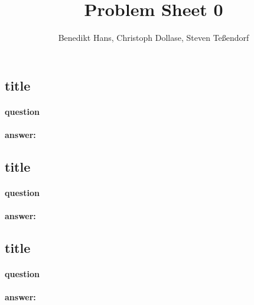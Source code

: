 \documentclass[a4paper,12pt]{article}
\author{Benedikt Hans, Christoph Dollase, Steven Te\ss endorf}
\title{ \textbf{Problem Sheet 0}}
\begin{document}
	 
 \maketitle	 %
 
 \subsection{title}
 \paragraph{question}
 \paragraph{answer:}
 
 
 \subsection{title}
 \paragraph{question}
 \paragraph{answer:}
 
 
 \subsection{title}
 \paragraph{question}
 \paragraph{answer:}
 
\end{document}
